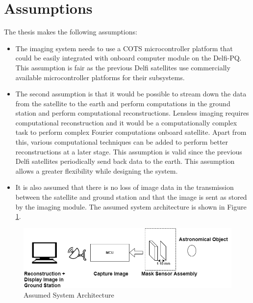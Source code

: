 \section{Assumptions}
The thesis makes the following assumptions:
\begin{itemize}
\item The imaging system needs to use a COTS microcontroller platform that could be easily integrated with onboard computer module on the Delfi-PQ. This assumption is fair as the previous Delfi satellites use commercially available microcontroller platforms for their subsystems.
\item The second assumption is that it would be possible to stream down the data from the satellite to the earth and perform computations in the ground station and perform computational reconstructions. Lensless imaging requires computational reconstruction and it would be a computationally complex task to perform complex Fourier computations onboard satellite. Apart from this, various computational techniques can be added to perform better reconstructions at a later stage. This assumption is valid since the previous Delfi satellites periodically send back data to the earth. This assumption allows a greater flexibility while designing the system.
\item It is also assumed that there is no loss of image data in the transmission between the satellite and ground station and that the image is sent as stored by the imaging module. The assumed system architecture is shown in Figure \ref{fig:SystemArchitecture}.
\end{itemize}
\begin{figure}[htb]
\includegraphics[width=\textwidth]{pics/Sys-Arch-1}
\caption{Assumed System Architecture}
\label{fig:SystemArchitecture}
\end{figure}


